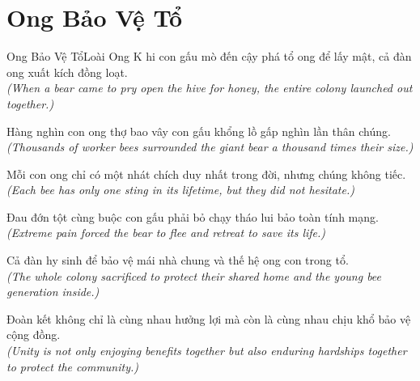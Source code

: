 \section{Ong Bảo Vệ Tổ}
\begin{truyen}{Ong Bảo Vệ Tổ}{Loài Ong}
K hi con gấu mò đến cậy phá tổ ong để lấy mật, cả đàn ong xuất kích đồng loạt.\\
\textit{(When a bear came to pry open the hive for honey, the entire colony launched out together.)}

Hàng nghìn con ong thợ bao vây con gấu khổng lồ gấp nghìn lần thân chúng.\\
\textit{(Thousands of worker bees surrounded the giant bear a thousand times their size.)}

Mỗi con ong chỉ có một nhát chích duy nhất trong đời, nhưng chúng không tiếc.\\
\textit{(Each bee has only one sting in its lifetime, but they did not hesitate.)}

Đau đớn tột cùng buộc con gấu phải bỏ chạy tháo lui bảo toàn tính mạng.\\
\textit{(Extreme pain forced the bear to flee and retreat to save its life.)}

Cả đàn hy sinh để bảo vệ mái nhà chung và thế hệ ong con trong tổ.\\
\textit{(The whole colony sacrificed to protect their shared home and the young bee generation inside.)}

\end{truyen}
\begin{baihoc}
  Đoàn kết không chỉ là cùng nhau hưởng lợi mà còn là cùng nhau chịu khổ bảo vệ cộng đồng.\\
  \textit{(Unity is not only enjoying benefits together but also enduring hardships together to protect the community.)}
\end{baihoc}

